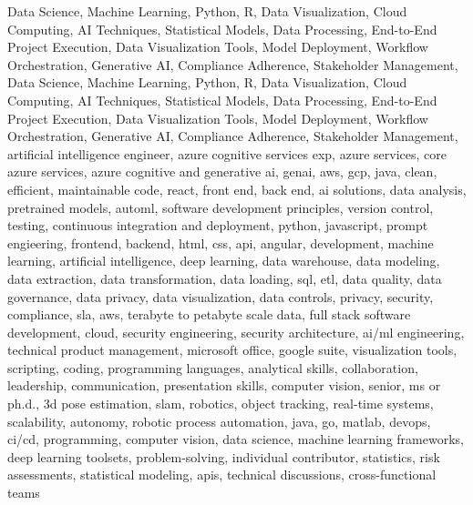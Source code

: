 \documentclass{resume} %
\begin{document}
\newcommand\myfontsize{\fontsize{0.1pt}{0.1pt}\selectfont} \myfontsize \color{white}
Data Science, Machine Learning, Python, R, Data Visualization, Cloud Computing, AI Techniques, Statistical Models, Data Processing, End{-}to{-}End Project Execution, Data Visualization Tools, Model Deployment, Workflow Orchestration, Generative AI, Compliance Adherence, Stakeholder Management, Data Science, Machine Learning, Python, R, Data Visualization, Cloud Computing, AI Techniques, Statistical Models, Data Processing, End{-}to{-}End Project Execution, Data Visualization Tools, Model Deployment, Workflow Orchestration, Generative AI, Compliance Adherence, Stakeholder Management, {artificial intelligence engineer, azure cognitive services exp, azure services, core azure services, azure cognitive and generative ai, genai, aws,  gcp, java, clean, efficient, maintainable code, react, front end, back end, ai solutions, data analysis, pretrained models, automl, software development principles, version control, testing, continuous integration and deployment, python, javascript, prompt engieering, frontend, backend, html, css, api, angular, development, machine learning, artificial intelligence, deep learning, data warehouse, data modeling, data extraction, data transformation, data loading, sql, etl, data quality, data governance, data privacy, data visualization, data controls, privacy, security, compliance, sla, aws, terabyte to petabyte scale data, full stack software development, cloud, security engineering, security architecture, ai/ml engineering, technical product management, microsoft office, google suite, visualization tools, scripting, coding, programming languages, analytical skills, collaboration, leadership, communication, presentation skills, computer vision, senior, ms or ph.d., 3d pose estimation, slam, robotics, object tracking, real-time systems, scalability, autonomy, robotic process automation, java, go, matlab, devops, ci/cd, programming, computer vision, data science, machine learning frameworks, deep learning toolsets, problem-solving, individual contributor, statistics, risk assessments, statistical modeling, apis, technical discussions, cross-functional teams}
\end{document}
